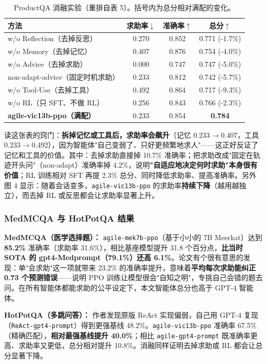 \documentclass[11pt,UTF8,fontset=fandol]{ctexart}
\begin{document}
\begin{table}[H]\centering
\caption{ProductQA 消融实验（重排自表 5）。括号内为总分相对满配的变化。}
\label{tab:ablation}
\small
\begin{tabular}{lccc}
\toprule
方法 & 求助率$\downarrow$ & 准确率$\uparrow$ & 总分$\uparrow$ \\ \midrule
w/o Reflection（去掉反思）   & 0.270 & 0.852 & 0.771 (-1.7\%) \\
w/o Memory（去掉记忆）       & 0.407 & 0.876 & 0.754 (-4.0\%) \\
w/o Advice（去掉求助）       & 0.000 & 0.747 & 0.747 (-5.0\%) \\
non-adapt-advice（固定时机求助） & 0.233 & 0.812 & 0.742 (-5.7\%) \\
w/o Tool-Use（去掉工具）     & 0.492 & 0.864 & 0.717 (-9.3\%) \\
w/o RL（只 SFT、不做 RL）     & 0.256 & 0.843 & 0.766 (-2.3\%) \\
\textbf{agile-vic13b-ppo（满配）} & 0.233 & 0.854 & \textbf{0.784} \\
\bottomrule
\end{tabular}
\end{table}

读这张表的窍门：\textbf{拆掉记忆或工具后，求助率会飙升}（记忆 0.233$\to$0.407，工具 0.233$\to$0.492），因为智能体"自己变弱了、只好更频繁地求人"——这正好反证了记忆和工具的价值。其中：去掉求助直接掉 10.7\% 准确率；把求助改成"固定在轨迹开头问"（non-adapt）准确率掉 4.2\%，说明\textbf{"自适应地决定何时求助"本身很有价值}；RL 训练相对 SFT 再提 2.3\% 总分、同时降低求助率、提高准确率。另外图 4 显示：随着会话变多，\texttt{agile-vic13b-ppo} 的求助率\textbf{持续下降}（越用越独立），而去掉 RL 或反思都会让求助率显著上升。

\subsubsection{MedMCQA 与 HotPotQA 结果}

\textbf{MedMCQA（医学选择题）：} \texttt{agile-mek7b-ppo}（基于小小的 7B Meerkat）达到 \textbf{85.2\%} 准确率（求助率 31.6\%），相比基座模型提升 31.8 个百分点，\textbf{比当时 SOTA 的 gpt4-Medprompt（79.1\%）还高 6.1\%}。论文有个很有意思的发现：单"会求助"这一项就带来 23.2\% 的准确率提升，意味着\textbf{平均每次求助能纠正 0.73 个预测错误}——说明 PPO 训练让模型很会"自知之明"，专挑自己会错的题去问。在所有智能体都能求助的公平设定下，本文智能体总分也高于 GPT-4 智能体。

\textbf{HotPotQA（多跳问答）：} 作者发现原版 ReAct 实现偏弱，自己用 GPT-4 复现（\texttt{ReAct-gpt4-prompt}）得到更强基线 48.2\%。\texttt{agile-vic13b-ppo} 准确率 67.5\%（精确匹配），\textbf{相对最强基线提升 40.0\%}；相比 \texttt{agile-gpt4-prompt} 既准确率更高、求助率又更低，总分相对提升 10.8\%。消融同样证明去掉求助或 RL 都会让总分显著下降。
\end{document}

